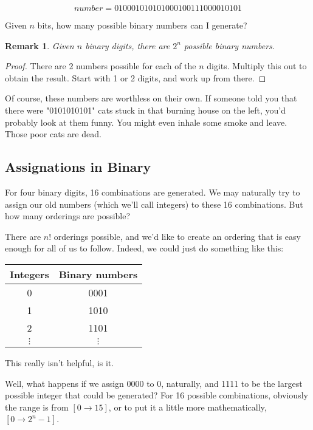 \documentclass[12pt]{article}
\newtheorem*{remark}
{Remark}
\begin{document}
\[number = 010001010101000100111000010101\]

Given $n$ bits, how many possible binary numbers can I generate?

\begin{remark}
    Given $n$ binary digits, there are $2^n$ possible binary numbers.
\end{remark}

\begin{proof}
    There are 2 numbers possible for each of the $n$ digits. Multiply
    this out to obtain the result. Start with 1 or 2 digits, and work up from there.
\end{proof}


    Of course, these numbers are worthless on their own. If someone told you that there were "0101010101"
    cats stuck in that burning house on the left, you'd probably look at them funny. You might even inhale some smoke
    and leave. Those poor cats are dead.

    \subsection*{Assignations in Binary}

    For four binary digits, 16 combinations are generated.
    We may naturally try to assign our old numbers (which we'll call integers) to these 16 combinations.
    But how many orderings are possible?

    There are $n!$ orderings possible, and we'd like to create an ordering
    that is easy enough for all of us to follow. Indeed, we could
    just do something like this:

    \newpage

    \begin{center}
        \begin{tabular}{|c|c|}
          \hline
          Integers & Binary numbers \\
          \hline
          0 & 0001 \\
          1 & 1010 \\
          2 & 1101 \\
          $\vdots$ & $\vdots$\\
          \hline
                     
        \end{tabular}
    \end{center}
    This really isn't helpful, is it.

    Well, what happens if we assign 0000 to 0, naturally, and 1111
    to be the largest possible integer that could be generated? For 16 possible
    combinations, obviously the range is from $[0 \rightarrow 15]$, or
    to put it a little more mathematically, $[0 \rightarrow 2^n - 1]$.
\end{document}
